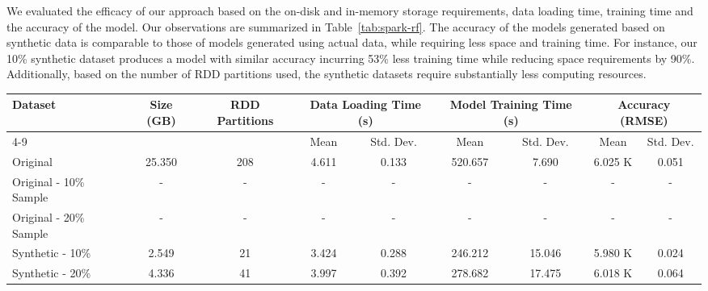 We evaluated the efficacy of our approach based on the on-disk and in-memory storage requirements, data loading time, training time and the accuracy of the model.
Our observations are summarized in Table~\ref{tab:spark-rf}.
The accuracy of the models generated based on synthetic data is comparable to those of models generated using actual data, while requiring less space and training time.
For instance, our 10\% synthetic dataset produces a model with similar accuracy incurring 53\% less training time while reducing space requirements by 90\%. Additionally, based on the number of RDD partitions used, the synthetic datasets require substantially less computing resources.
%
\begin{table*}[ht!]
    \renewcommand{\arraystretch}{1.2}
    \caption{Comparing Random Forest based regression models generated by Spark MLlib using synthetic vs. real data \vspace{-1em}}
    \label{tab:spark-rf}
    \begin{center}
        \begin{tabularx}{\textwidth}{|X|c|c|c|c|c|c|c|c|}
            \hline
            \multirow{2}{*}{Dataset} & \multirow{2}{*}{Size (GB)} & \multirow{2}{*}{RDD Partitions} & \multicolumn{2}{c|}{\cellcolor[gray]{0.7}Data Loading Time (s)} &\multicolumn{2}{c|}{\cellcolor[gray]{0.7}Model Training Time (s)} & \multicolumn{2}{c|}{\cellcolor[gray]{0.7}Accuracy (RMSE)}\\
            \cline{4-9}
             & & & \cellcolor[gray]{0.9}Mean & \cellcolor[gray]{0.9}Std. Dev.  &  \cellcolor[gray]{0.9}Mean & \cellcolor[gray]{0.9}Std. Dev. &  \cellcolor[gray]{0.9}Mean & \cellcolor[gray]{0.9}Std. Dev. \\
            \hline
            Original & 25.350 & 208 & 4.611 & 0.133 & 520.657 & 7.690 & 6.025 K & 0.051 \\
            \hline
            Original - 10\% Sample & - & - & - & - & - & - & -  & - \\
            \hline
            Original - 20\% Sample & - & - & - & - & - & - & - & - \\
            \hline
            Synthetic - 10\% & 2.549 & 21 & 3.424 & 0.288 & 246.212 & 15.046 & 5.980 K & 0.024 \\
            \hline
            Synthetic - 20\% & 4.336 & 41 & 3.997 & 0.392 & 278.682 & 17.475 & 6.018 K & 0.064 \\
            \hline
        \end{tabularx}
    \end{center}
    \vspace{-1em}
\end{table*}
%
